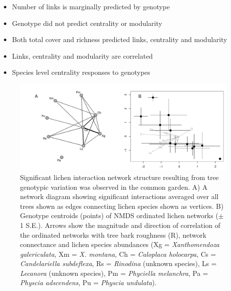 \documentclass[9pt,twocolumn,twoside,lineno]{pnas-new}
\begin{document}
{\begin{itemize}
\item Number of links is marginally predicted by genotype
\item Genotype did not predict centrality or modularity
\item Both total cover and richness predicted links, centrality and
  modularity
\item Links, centrality and modularity are correlated
\item Species level centrality responses to genotypes
\end{itemize}



\begin{figure}[ht]
\centering
\includegraphics[width=\linewidth]{cn_chplot_onc.pdf}
\caption{Significant lichen interaction network structure resulting
  from tree genotypic variation was observed in the common garden. A)
  A network diagram showing significant interactions averaged over all
  trees shown as edges connecting lichen species shown as vertices. B)
  Genotype centroids (points) of NMDS ordinated lichen networks ($\pm$
  1 S.E.). Arrows show the magnitude and direction of correlation of
  the ordinated networks with tree bark roughness (R), network
  connectance and lichen species abundances (Xg =
  \textit{Xanthomendoza galericulata}, Xm = \textit{X. montana}, Ch =
  \textit{Caloplaca holocarpa}, Cs = \textit{Candelariella
    subdeflexa}, Rs = \textit{Rinodina} (unknown species), Ls =
  \textit{Lecanora} (unknown species), Pm = \textit{Phyciella
    melanchra}, Pa = \textit{Physcia adscendens}, Pu = \textit{Physcia
    undulata}).}
\label{fig:ch_plot}
\end{figure}

}
\end{document}
